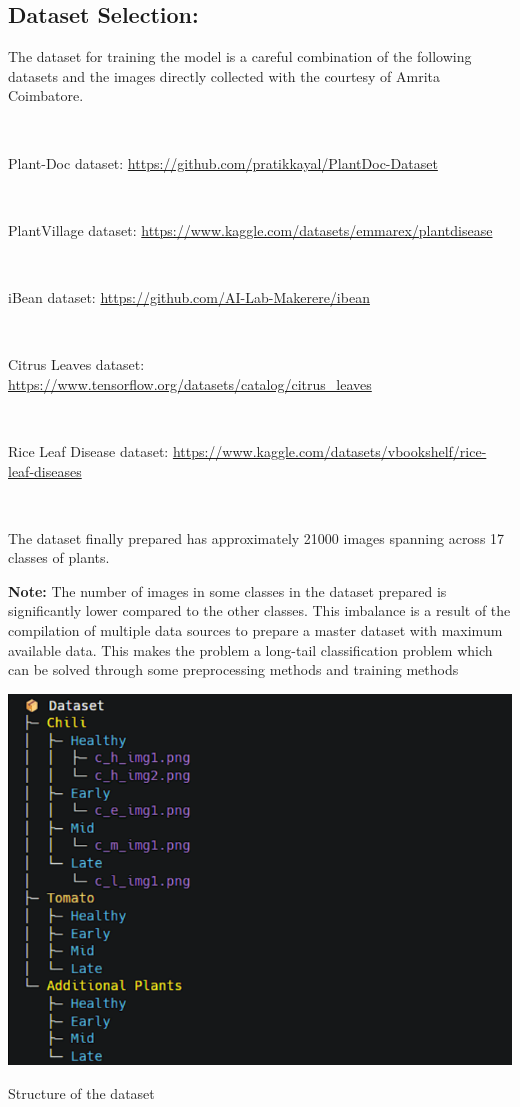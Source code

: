 \subsection{Dataset Selection:}

The dataset for training the model is a careful combination of the following datasets and the images directly collected with the courtesy of Amrita Coimbatore.

\

Plant-Doc dataset: \url{https://github.com/pratikkayal/PlantDoc-Dataset} 

\

PlantVillage dataset: \url{https://www.kaggle.com/datasets/emmarex/plantdisease}

\

iBean dataset: \url{https://github.com/AI-Lab-Makerere/ibean}

\

Citrus Leaves dataset: \url{https://www.tensorflow.org/datasets/catalog/citrus_leaves}

\

Rice Leaf Disease dataset: \url{https://www.kaggle.com/datasets/vbookshelf/rice-leaf-diseases}

\

The dataset finally prepared has approximately 21000 images spanning across 17 classes of plants.

 \textbf{Note:} The number of images in some classes in the dataset prepared is significantly lower compared to the other classes. This imbalance is a result of the compilation of multiple data sources to prepare a master dataset with maximum available data. This makes the problem a long-tail classification problem which can be solved through some preprocessing methods and training methods


\begin{center}
    \includegraphics[scale=0.5]{images/ds.png}
    
    \caption{Structure of the dataset}
\end{center}


